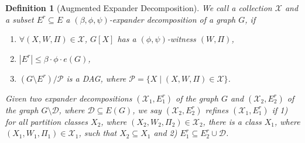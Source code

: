 \documentclass[11pt]{article}
\newtheorem{definition}[theorem]{Definition}
\begin{document}
\begin{definition}[Augmented Expander Decomposition]\label{def:augmentedED}
    We call a collection $\mathcal{X}$ and a subset $E^r \subseteq E$ a $(\beta, \phi, \psi)$-expander decomposition of a graph $G$, if 
    \begin{enumerate}
        \item \label{Def:ED-item1} $\forall (X, W, \Pi) \in \mathcal{X}$, $G[X]$ has a $(\phi, \psi)$-witness $(W, \Pi)$,
        \item \label{Def:ED-item2} $|E^r| \leq \beta \cdot \phi \cdot e(G)$,
        \item \label{Def:ED-item3} $(G \setminus E^r)/ \mathcal{P}$ is a DAG, where $\mathcal{P} = \{X \mid (X, W, \Pi) \in \mathcal{X}\}$.
    \end{enumerate}
    Given two expander decompositions $(\mathcal{X}_1,E^r_1)$ of the graph $G$ and  $ (\mathcal{X}_2,E^r_2)$ of the graph $G \setminus \mathcal{D}$, where $\mathcal{D} \subseteq E(G)$, we say $(\mathcal{X}_2,E^r_2)$ refines $(\mathcal{X}_1,E^r_1)$ if 1) for all partition classes $X_2$, where $(X_2, W_2, \Pi_2) \in \mathcal{X}_2$, there is a class $X_1$, where 
    $(X_1, W_1, \Pi_1) \in \mathcal{X}_1$, such that $X_2 \subseteq X_1$ and 2) $E_1^r \subseteq E_2^r \cup \mathcal{D}$.
\end{definition}
\end{document}
